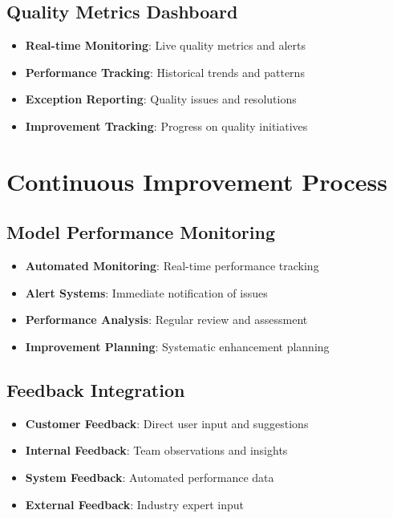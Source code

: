 \documentclass[business]{../templates/infraradar-main}
\begin{document}
\subsection{Quality Metrics Dashboard}
\begin{itemize}
    \item \textbf{Real-time Monitoring}: Live quality metrics and alerts
    \item \textbf{Performance Tracking}: Historical trends and patterns
    \item \textbf{Exception Reporting}: Quality issues and resolutions
    \item \textbf{Improvement Tracking}: Progress on quality initiatives
\end{itemize}

\section{Continuous Improvement Process}

\subsection{Model Performance Monitoring}
\begin{itemize}
    \item \textbf{Automated Monitoring}: Real-time performance tracking
    \item \textbf{Alert Systems}: Immediate notification of issues
    \item \textbf{Performance Analysis}: Regular review and assessment
    \item \textbf{Improvement Planning}: Systematic enhancement planning
\end{itemize}

\subsection{Feedback Integration}
\begin{itemize}
    \item \textbf{Customer Feedback}: Direct user input and suggestions
    \item \textbf{Internal Feedback}: Team observations and insights
    \item \textbf{System Feedback}: Automated performance data
    \item \textbf{External Feedback}: Industry expert input
\end{itemize}
\end{document}
